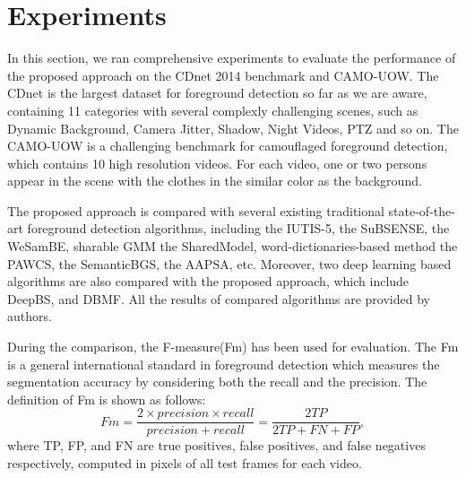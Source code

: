 \documentclass[journal]{IEEEtran}
\begin{document}
\section{Experiments}
\label{sec5}
In this section, we ran comprehensive experiments to evaluate the performance of the proposed approach on the CDnet 2014 benchmark\cite{CDN2014} and CAMO-UOW\cite{CAMO}. 
The CDnet is the largest dataset for foreground detection so far as we are aware, containing 11 categories with several complexly challenging scenes, such as Dynamic Background, Camera Jitter, Shadow, Night Videos, PTZ and so on. 
The CAMO-UOW is a challenging benchmark for camouflaged foreground detection, which contains 10 high resolution videos. 
For each video, one or two persons appear in the scene with the clothes in the similar color as the background.

The proposed approach is compared with several existing traditional state-of-the-art foreground detection algorithms, including the IUTIS-5\cite{Bianco2017TEC}, the SuBSENSE\cite{St-Charles2015SuBSENSE}, the WeSamBE\cite{Jiang2017WeSamBE}, sharable GMM the SharedModel\cite{Chen2015SharedModel}, word-dictionaries-based method the PAWCS\cite{Charles2015PAWCS}, the SemanticBGS\cite{Braham2017Semantic}, the AAPSA\cite{RAMIREZALONSO2016990}, etc. 
Moreover, two deep learning based algorithms are also compared with the proposed approach, which include DeepBS\cite{Babaee2017deep}, and DBMF\cite{Yang2018DBMF}. 
All the results of compared algorithms are provided by authors.

During the comparison, the F-measure(Fm) has been used for evaluation. 
The Fm is a general international standard in foreground detection which measures the segmentation accuracy by considering both the recall and the precision. 
The definition of Fm is shown as follows:
\begin{equation}
Fm= \frac{2\times precision \times recall}{precision + recall} = \frac{2TP}{2TP+FN+FP},
\end{equation}
% 
% 
%
where TP, FP, and FN are true positives, false positives, and false negatives respectively, computed in pixels of all test frames for each video. 
\end{document}
